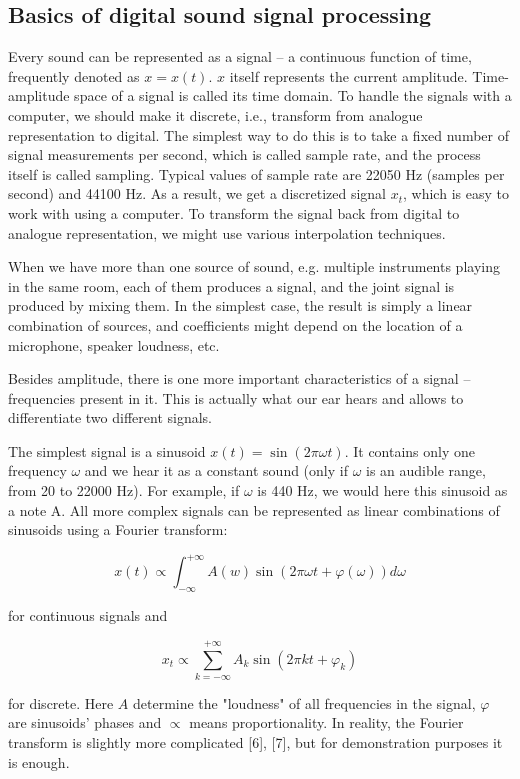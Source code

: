 \documentclass[../main.tex]{subfiles} %
\begin{document}
\subsection{Basics of digital sound signal processing}

Every sound can be represented as a signal -- a continuous function of time, frequently denoted as $x = x(t)$. $x$ itself represents the current amplitude. Time-amplitude space of a signal is called its time domain.
To handle the signals with a computer, we should make it discrete, i.e., transform from analogue representation to digital. The simplest way to do this is to take a fixed number of signal measurements per second, which is called sample rate, and the process itself is called sampling. Typical values of sample rate are 22050 Hz (samples per second) and 44100 Hz. As a result, we get a discretized signal $x_t$, which is easy to work with using a computer. To transform the signal back from digital to analogue representation, we might use various interpolation techniques.

When we have more than one source of sound, e.g. multiple instruments playing in the same room, each of them produces a signal, and the joint signal is produced by mixing them. In the simplest case, the result is simply a linear combination of sources, and coefficients might depend on the location of a microphone, speaker loudness, etc.


Besides amplitude, there is one more important characteristics of a signal -- frequencies present in it. This is actually what our ear hears and allows to differentiate two different signals.

The simplest signal is a sinusoid $x(t) = \sin(2\pi \omega t)$. It contains only one frequency $\omega$ and we hear it as a constant sound (only if $\omega$ is an audible range, from 20 to 22000 Hz). For example, if $\omega$ is 440 Hz, we would here this sinusoid as a note A.
All more complex signals can be represented as linear combinations of sinusoids using a Fourier transform:

\[x(t) \propto \int_{-\infty}^{+\infty} A(w) \sin(2\pi \omega t + \varphi(\omega)) d \omega\]

for continuous signals and 

\[x_t \propto \sum_{k=-\infty}^{+\infty} A_k \sin(2 \pi k t + \varphi_k)\]

for discrete. 
Here $A$ determine the "loudness" of all frequencies in the signal, $\varphi$ are sinusoids' phases and $\propto$ means proportionality. In reality, the Fourier transform is slightly more complicated [6], [7], but for demonstration purposes it is enough.
\end{document}

